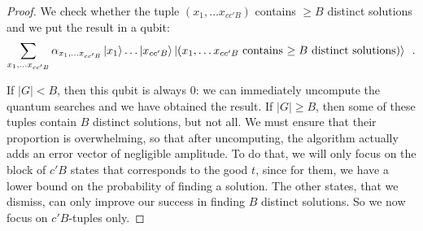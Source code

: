 \begin{proof}
We check whether the tuple $(x_1, \ldots x_{c c' B})$ contains $\geq B$ distinct solutions and we put the result in a qubit:
$$ \sum_{x_1, \ldots x_{ c c'B}} \alpha_{x_1, \ldots x_{c c'B}}\left| x_1 \right\rangle \ldots \left| x_{c c'B} \right\rangle \left|  (x_1, \ldots x_{c c' B} \mbox{ contains $\geq B$ distinct solutions} ) \right\rangle \enspace. $$

%
%
%
%


If $|G| < B$, then this qubit is always $0$: we can immediately uncompute the quantum searches and we have obtained the result. If $|G| \geq B$, then some of these tuples contain $B$ distinct solutions, but not all. We must ensure that their proportion is overwhelming, so that after uncomputing, the algorithm actually adds an error vector of negligible amplitude. To do that, we will only focus on the block of $c' B$ states that corresponds to the good $t$, since for them, we have a lower bound on the probability of finding a solution. The other states, that we dismiss, can only improve our success in finding $B$ distinct solutions. So we now focus on $c'B$-tuples only.


\end{proof}
